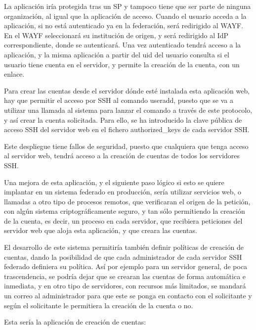     La aplicación iría protegida tras un SP y tampoco tiene que ser parte
    de ninguna organización, al igual que la aplicación de acceso. Cuando
    el usuario acceda a la aplicación, si no está autenticado ya en la
    federación, será redirigido al WAYF. En el WAYF seleccionará su
    institución de origen, y será redirigido al IdP correspondiente, donde
    se autenticará. Una vez autenticado tendrá acceso a la aplicación, y la
    misma aplicación a partir del uid del usuario consulta si el usuario
    tiene cuenta en el servidor, y permite la creación de la cuenta, con un
    enlace.

    Para crear las cuentas desde el servidor dónde esté instalada esta
    aplicación web, hay que permitir el acceso por SSH al comando useradd,
    puesto que se va a utilizar una llamada al sistema para lanzar el
    comando a través de este protocolo, y así crear la cuenta solicitada.
    Para ello, se ha introducido la clave pública de acceso SSH del
    servidor web en el fichero authorized\_keys de cada servidor SSH.

    Este despliegue tiene fallos de seguridad, puesto que cualquiera que
    tenga acceso al servidor web, tendrá acceso a la creación de cuentas de
    todos los servidores SSH.

    Una mejora de esta aplicación, y el siguiente paso lógico si esto se
    quiere implantar en un sistema federado en producción, sería utilizar
    servicios web, o llamadas a otro tipo de procesos remotos, que
    verificaran el origen de la petición, con algún sistema
    criptográficamente seguro, y tan sólo permitiendo la creación de la
    cuenta, es decir, un proceso en cada servidor, que recibiera peticiones
    del servidor web que aloja esta aplicación, y que creara las cuentas.

    El desarrollo de este sistema permitiría también definir políticas de
    creación de cuentas, dando la posibilidad de que cada administrador de
    cada servidor SSH federado definiera su política. Así por ejemplo para
    un servidor general, de poca trascendencia, se podría dejar que se
    crearan las cuentas de forma automática e inmediata, y en otro tipo de
    servidores, con recursos más limitados, se mandará un correo al
    administrador para que este se ponga en contacto con el solicitante y
    según el solicitante le permitiera la creación de la cuenta o no.

    Esta sería la aplicación de creación de cuentas:
     
